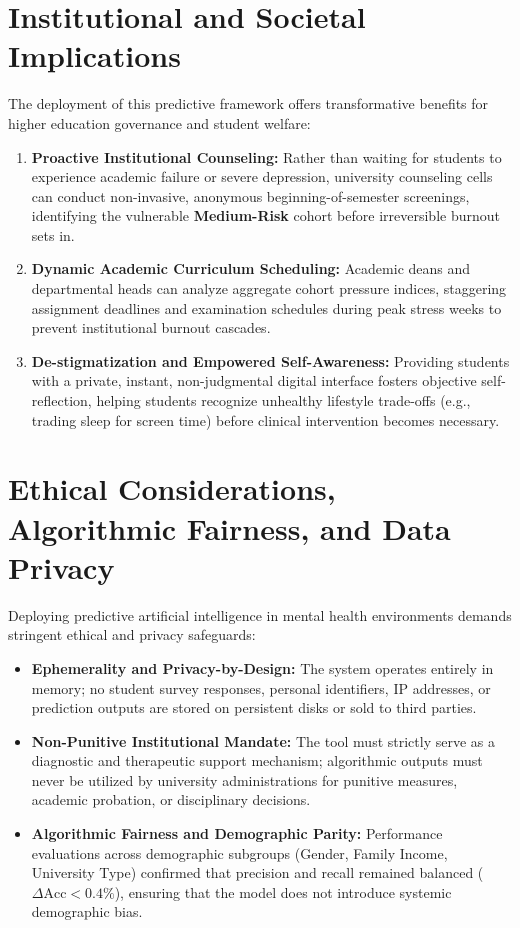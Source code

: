 \documentclass[12pt,a4paper,oneside]{report}
\begin{document}
\section{Institutional and Societal Implications}
\label{sec:societal_implications}
The deployment of this predictive framework offers transformative benefits for higher education governance and student welfare:
\begin{enumerate}
    \item \textbf{Proactive Institutional Counseling:} Rather than waiting for students to experience academic failure or severe depression, university counseling cells can conduct non-invasive, anonymous beginning-of-semester screenings, identifying the vulnerable \textbf{Medium-Risk} cohort before irreversible burnout sets in.
    \item \textbf{Dynamic Academic Curriculum Scheduling:} Academic deans and departmental heads can analyze aggregate cohort pressure indices, staggering assignment deadlines and examination schedules during peak stress weeks to prevent institutional burnout cascades.
    \item \textbf{De-stigmatization and Empowered Self-Awareness:} Providing students with a private, instant, non-judgmental digital interface fosters objective self-reflection, helping students recognize unhealthy lifestyle trade-offs (e.g., trading sleep for screen time) before clinical intervention becomes necessary.
\end{enumerate}

\section{Ethical Considerations, Algorithmic Fairness, and Data Privacy}
\label{sec:ethical_safeguards}
Deploying predictive artificial intelligence in mental health environments demands stringent ethical and privacy safeguards:
\begin{itemize}
    \item \textbf{Ephemerality and Privacy-by-Design:} The system operates entirely in memory; no student survey responses, personal identifiers, IP addresses, or prediction outputs are stored on persistent disks or sold to third parties.
    \item \textbf{Non-Punitive Institutional Mandate:} The tool must strictly serve as a diagnostic and therapeutic support mechanism; algorithmic outputs must never be utilized by university administrations for punitive measures, academic probation, or disciplinary decisions.
    \item \textbf{Algorithmic Fairness and Demographic Parity:} Performance evaluations across demographic subgroups (Gender, Family Income, University Type) confirmed that precision and recall remained balanced ($\Delta \text{Acc} < 0.4\%$), ensuring that the model does not introduce systemic demographic bias.
\end{itemize}
\end{document}
